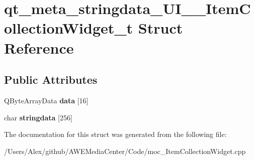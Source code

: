 \hypertarget{structqt__meta__stringdata___u_i_____item_collection_widget__t}{\section{qt\-\_\-meta\-\_\-stringdata\-\_\-\-U\-I\-\_\-\-\_\-\-Item\-Collection\-Widget\-\_\-t Struct Reference}
\label{structqt__meta__stringdata___u_i_____item_collection_widget__t}
}
\subsection*{Public Attributes}
\begin{DoxyCompactItemize}
\item 
\hypertarget{structqt__meta__stringdata___u_i_____item_collection_widget__t_a67c077bac04a91f66fb059e91ea4cba8}{Q\-Byte\-Array\-Data {\bfseries data} \mbox{[}16\mbox{]}}\label{structqt__meta__stringdata___u_i_____item_collection_widget__t_a67c077bac04a91f66fb059e91ea4cba8}

\item 
\hypertarget{structqt__meta__stringdata___u_i_____item_collection_widget__t_aa8a0c4c3b5f209efba114d1dca4cf754}{char {\bfseries stringdata} \mbox{[}256\mbox{]}}\label{structqt__meta__stringdata___u_i_____item_collection_widget__t_aa8a0c4c3b5f209efba114d1dca4cf754}

\end{DoxyCompactItemize}


The documentation for this struct was generated from the following file\-:\begin{DoxyCompactItemize}
\item 
/\-Users/\-Alex/github/\-A\-W\-E\-Media\-Center/\-Code/moc\-\_\-\-Item\-Collection\-Widget.\-cpp\end{DoxyCompactItemize}
